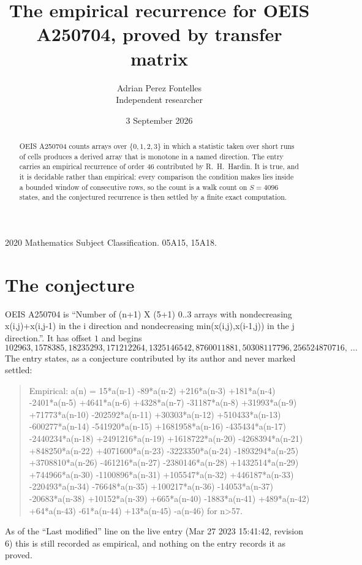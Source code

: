 \documentclass[11pt,a4paper]{article}
\title{The empirical recurrence for OEIS A250704, proved by transfer matrix}
\author{Adrian Perez Fontelles\\ \small Independent researcher}
\date{3 September 2026}
\theoremstyle{plain}
\theoremstyle{definition}
\begin{document}
\maketitle

\begin{abstract}
OEIS A250704 counts arrays over $\{0,1,2,3\}$ in which a statistic taken over short runs
of cells produces a derived array that is monotone in a named direction. The entry carries an
empirical recurrence of order $46$ contributed by R.~H.~Hardin. It is true, and it is
decidable rather than empirical: every comparison the condition makes lies inside a bounded
window of consecutive rows, so the count is a walk count on $S=4096$ states, and the
conjectured recurrence is then settled by a finite exact computation.
\end{abstract}

\noindent\small 2020 Mathematics Subject Classification. 05A15, 15A18.\normalsize

\section{The conjecture}

OEIS A250704 is ``Number of (n+1) X (5+1) 0..3 arrays with nondecreasing x(i,j)+x(i,j-1) in the i direction and nondecreasing min(x(i,j),x(i-1,j)) in the j direction.''. It has offset $1$ and begins
\[
102963, 1578385, 18235293, 171212264, 1325146542, 8760011881, 50308117796, 256524870716,\ \dots
\]
The entry states, as a conjecture contributed by its author and never marked settled:
\begin{quote}
Empirical: a(n) = 15*a(n-1) -89*a(n-2) +216*a(n-3) +181*a(n-4) -2401*a(n-5) +4641*a(n-6) +4328*a(n-7) -31187*a(n-8) +31993*a(n-9) +71773*a(n-10) -202592*a(n-11) +30303*a(n-12) +510433*a(n-13) -600277*a(n-14) -541920*a(n-15) +1681958*a(n-16) -435434*a(n-17) -2440234*a(n-18) +2491216*a(n-19) +1618722*a(n-20) -4268394*a(n-21) +848250*a(n-22) +4071600*a(n-23) -3223350*a(n-24) -1893294*a(n-25) +3708810*a(n-26) -461216*a(n-27) -2380146*a(n-28) +1432514*a(n-29) +744966*a(n-30) -1100896*a(n-31) +105547*a(n-32) +446187*a(n-33) -220493*a(n-34) -76648*a(n-35) +100217*a(n-36) -14053*a(n-37) -20683*a(n-38) +10152*a(n-39) +665*a(n-40) -1883*a(n-41) +489*a(n-42) +64*a(n-43) -61*a(n-44) +13*a(n-45) -a(n-46) for n>57.
\end{quote}
As of the ``Last modified'' line on the live entry (Mar 27 2023 15:41:42, revision 6) this is still
recorded as empirical, and nothing on the entry records it as proved.
\end{document}
